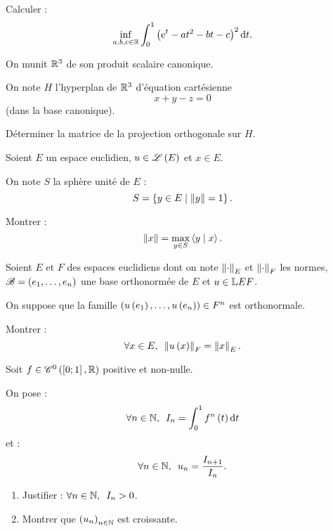 \begin{exo}[Exercice 7]
Calculer : \[\inf_{a,b,c\in\R}\int_0^1\paren{\e{t}-at^2-bt-c}^2\odif{t}.\]
\end{exo}

\begin{corr}
\end{corr}

\begin{exo}[Exercice 8]
On munit \(\mathbb{R}^3\) de son produit scalaire canonique.

On note \(H\) l'hyperplan de \(\mathbb{R}^3\) d'équation cartésienne \[x+y-z=0\] (dans la base canonique).

Déterminer la matrice de la projection orthogonale sur \(H\).
\end{exo}

\begin{corr}
\end{corr}

\begin{exo}[Exercice 9]
Soient \(E\) un espace euclidien, \(u\in\mathscr{L}\left(E\right)\) et \(x\in E\).

On note \(S\) la sphère unité de \(E\) : \[S=\left\lbrace y\in E\;\middle|\;\left\|y\right\|=1\right\rbrace.\]

Montrer : \[\left\|x\right\|=\max_{y\in S}\left\langle y\;\middle|\; x\right\rangle.\]
\end{exo}

\begin{corr}
\end{corr}

\begin{exo}[Exercice 10]
Soient \(E\) et \(F\) des espaces euclidiens dont on note \(\left\|\cdot\right\|_E\) et \(\left\|\cdot\right\|_F\) les normes, \(\mathscr{B}=\left(e_1,\dots,e_n\right)\) une base orthonormée de \(E\) et \(u\in\mathbb{L}{E}{F}\).

On suppose que la famille \(\left(u\left(e_1\right),\dots,u\left(e_n\right)\right)\in F^n\) est orthonormale.

Montrer : \[\quantifs{\forall x\in E}\norme{u\paren{x}}_F=\norme{x}_E.\]
\end{exo}

\begin{corr}
\end{corr}

\begin{exo}[Exercice 11]
Soit \(f\in\mathscr{C}^{0}\left(\left[0;1\right],\mathbb{R}\right)\) positive et non-nulle.

On pose : \[\quantifs{\forall n\in\N}I_n=\int_0^1f^n\paren{t}\odif{t}\] et : \[\quantifs{\forall n\in\N}u_n=\dfrac{I_{n+1}}{I_n}.\]

\begin{enumerate}
\item Justifier : \(\quantifs{\forall n\in\N}I_n>0\). \\

\item Montrer que \(\left(u_n\right)_{n\in\mathbb{N}}\) est croissante.
\end{enumerate}
\end{exo}

